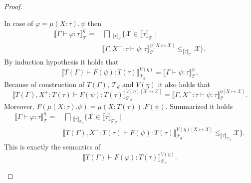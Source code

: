 \begin{proof}
\begin{compactitem}
        \item In case of $\varphi = \mu(X \colon \tau).\,\psi$ then
        \begin{align*}
            \llbracket \Gamma \vdash \varphi \colon \tau \rrbracket^\eta_\mathcal{T} =&\,\bigsqcap\,
            _{\llbracket\tau\rrbracket_\mathcal{T}} \{\mathcal{X} \in \llbracket \tau \rrbracket_\mathcal{T}
            \mid \\
            &\llbracket \Gamma, X^+ \colon \tau \vdash \psi \colon \tau \rrbracket^{\eta[X \mapsto
            \mathcal{X}]}_\mathcal{T}
            \leq_{\llbracket \tau \rrbracket_\mathcal{T}} \mathcal{X}\}.
        \end{align*}
        By induction hypothesis it holds that \[\llbracket T(\Gamma) \vdash F(\psi) \colon T
        (\tau) \rrbracket^{V(\eta)}_{\mathcal{T}_d} = \llbracket \Gamma
        \vdash \psi \colon \tau \rrbracket^\eta_\mathcal{T}.\]
        Because of construction of $T(\Gamma)$, $\mathcal{T}_d$ and $V(\eta)$ it also holds that
        \[\llbracket T(\Gamma), X^+ \colon T(\tau) \vdash F(\psi) \colon T
        (\tau) \rrbracket^{V(\eta)[X \mapsto \mathcal{X}]}_{\mathcal{T}_d} = \llbracket \Gamma, X^+ \colon \tau
        \vdash \psi \colon \tau \rrbracket^{\eta[X \mapsto \mathcal{X}]}_\mathcal{T}.\]
        Moreover, $F(\mu(X \colon \tau).\psi) = \mu(X \colon T(\tau)).F(\psi)$. Summarized it holds
        \begin{align*}
            \llbracket \Gamma \vdash \varphi \colon \tau \rrbracket^\eta_\mathcal{T} =&\,\bigsqcap\,
            _{\llbracket\tau\rrbracket_{\mathcal{T}_d}} \{\mathcal{X} \in \llbracket \tau \rrbracket_{\mathcal{T}_d}
            \mid \\
            &\llbracket T(\Gamma), X^+ \colon T(\tau) \vdash F(\psi) \colon T(\tau) \rrbracket^{V(\eta)[X \mapsto
            \mathcal{X}]}_{\mathcal{T}_d}
            \leq_{\llbracket \tau \rrbracket_{\mathcal{T}_d}} \mathcal{X}\}.
        \end{align*}
        This is exactly the semantics of
        \[\llbracket T(\Gamma) \vdash F(\varphi) \colon T(\tau) \rrbracket^{V(\eta)}_{\mathcal{T}_d}.\]


\end{compactitem}
\end{proof}
